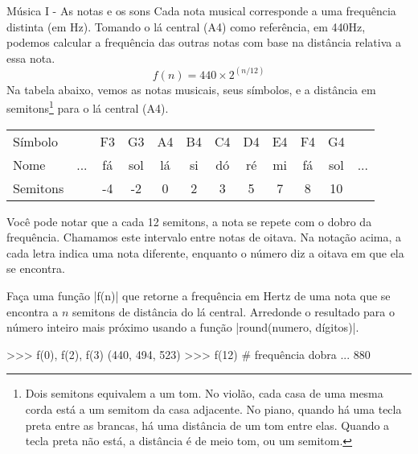 	\begin{problem}[p:musica:1]{Música I - As notas e os sons}
		Cada nota musical corresponde a uma frequência distinta (em Hz). Tomando o lá central (A4) como referência, em 440Hz, podemos calcular a frequência das outras notas com base na distância relativa a essa nota.
        $$f(n) = 440 \times 2^{(n/12)}$$
        Na tabela abaixo, vemos as notas musicais, seus símbolos, e a distância em semitons\footnote{Dois semitons equivalem a um tom. No violão, cada casa de uma mesma corda está a um semitom da casa adjacente. No piano, quando há uma tecla preta entre as brancas, há uma distância de um tom entre elas. Quando a tecla preta não está, a distância é de meio tom, ou um semitom.} para o lá central (A4).

		\begin{center}
            \begin{tabular}{|l|c c c c c c c c c c c|}
                \hline
                Símbolo &  & F3 & G3 & A4 & B4 & C4 & D4 & E4 & F4 & G4 & \\
                Nome & ... & fá & sol & lá & si & dó & ré & mi & fá & sol &  ... \\
                Semitons &  & -4 & -2 & 0 & 2 & 3 & 5 & 7 & 8 & 10 & \\
                \hline
            \end{tabular}
        \end{center}

		Você pode notar que a cada 12 semitons, a nota se repete com o dobro da frequência. Chamamos este intervalo entre notas de oitava. Na notação acima, a cada letra indica uma nota diferente, enquanto o número diz a oitava em que ela se encontra. \par
        
		\proposal
        Faça uma função |f(n)| que retorne a frequência em Hertz de uma nota que se encontra a $n$ semitons de distância do lá central. Arredonde o resultado para o número inteiro mais próximo usando a função |round(numero, dígitos)|. \par
        
        \begin{lstpython}
	>>> f(0), f(2), f(3)
	(440, 494, 523)
	>>> f(12) # frequência dobra ...
	880
        \end{lstpython}
	\end{problem}

